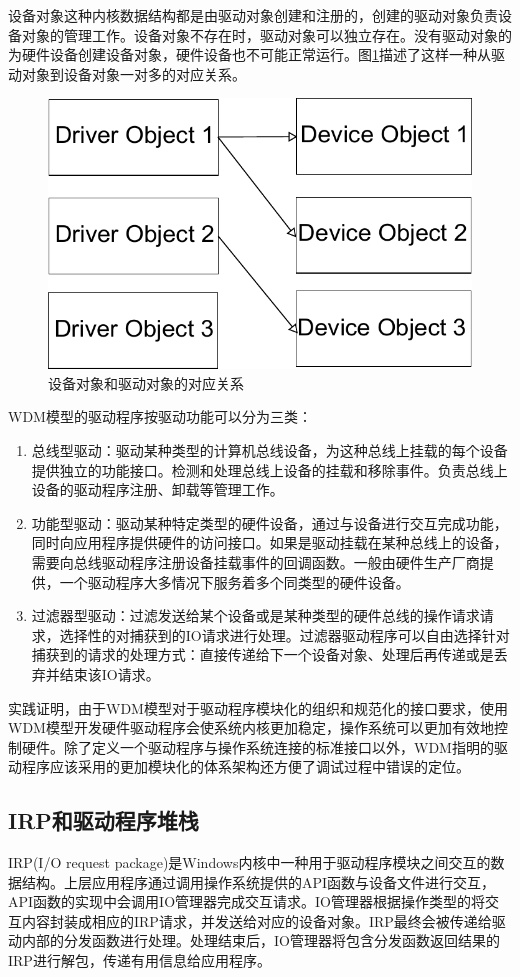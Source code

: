 设备对象这种内核数据结构都是由驱动对象创建和注册的，创建的驱动对象负责设备对象的管理工作。设备对象不存在时，驱动对象可以独立存在。没有驱动对象的为硬件设备创建设备对象，硬件设备也不可能正常运行。图\ref{fig:drv-to-dev}描述了这样一种从驱动对象到设备对象一对多的对应关系。
\begin{figure}[H]
\centering
\includegraphics[width=0.6\linewidth]{./graph/drv-to-dev}
\caption{设备对象和驱动对象的对应关系}
\label{fig:drv-to-dev}
\end{figure}

WDM模型的驱动程序按驱动功能可以分为三类：
\begin{enumerate}
\item
总线型驱动：驱动某种类型的计算机总线设备，为这种总线上挂载的每个设备提供独立的功能接口。检测和处理总线上设备的挂载和移除事件。负责总线上设备的驱动程序注册、卸载等管理工作。
\item
功能型驱动：驱动某种特定类型的硬件设备，通过与设备进行交互完成功能，同时向应用程序提供硬件的访问接口。如果是驱动挂载在某种总线上的设备，需要向总线驱动程序注册设备挂载事件的回调函数。一般由硬件生产厂商提供，一个驱动程序大多情况下服务着多个同类型的硬件设备。
\item
过滤器型驱动：过滤发送给某个设备或是某种类型的硬件总线的操作请求请求，选择性的对捕获到的IO请求进行处理。过滤器驱动程序可以自由选择针对捕获到的请求的处理方式：直接传递给下一个设备对象、处理后再传递或是丢弃并结束该IO请求。
\end{enumerate}

实践证明，由于WDM模型对于驱动程序模块化的组织和规范化的接口要求，使用WDM模型开发硬件驱动程序会使系统内核更加稳定，操作系统可以更加有效地控制硬件。除了定义一个驱动程序与操作系统连接的标准接口以外，WDM指明的驱动程序应该采用的更加模块化的体系架构还方便了调试过程中错误的定位。

\subsection{IRP和驱动程序堆栈}
IRP(I/O request package)是Windows内核中一种用于驱动程序模块之间交互的数据结构。上层应用程序通过调用操作系统提供的API函数与设备文件进行交互，API函数的实现中会调用IO管理器完成交互请求。IO管理器根据操作类型的将交互内容封装成相应的IRP请求，并发送给对应的设备对象。IRP最终会被传递给驱动内部的分发函数进行处理。处理结束后，IO管理器将包含分发函数返回结果的IRP进行解包，传递有用信息给应用程序。

